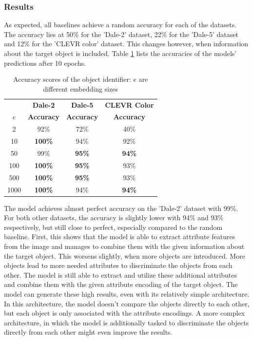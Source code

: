 \subsubsection*{Results}
As expected, all baselines achieve a random accuracy for each of the datasets.
The accuracy lies at 50\% for the 'Dale-2' dataset, 22\% for the 'Dale-5' dataset and 12\% for the 'CLEVR color' dataset.
This changes however, when information about the target object is included.
Table \ref{tab:results_bounding_box_classifier} lists the accuracies of the models' predictions after 10 epochs.

\begin{table}[ht]
    \centering
    \begin{tabular}{c|c|c|c}
        \toprule
               & \textbf{Dale-2}   & \textbf{Dale-5}   & \textbf{CLEVR Color} \\\cmidrule(lr){2-2}\cmidrule(lr){3-3}\cmidrule(lr){4-4}
        $e$    & \textbf{Accuracy} & \textbf{Accuracy} & \textbf{Accuracy}    \\\midrule
        {2}    & {92\%}            & {72\%}            & {40\%}               \\
        {10}   & \textbf{100\%}    & {94\%}            & {92\%}               \\
        {50}   & {99\%}            & \textbf{95\%}     & \textbf{94\%}        \\
        {100}  & \textbf{100\%}    & \textbf{95\%}     & {93\%}               \\
        {500}  & \textbf{100\%}    & \textbf{95\%}     & {93\%}               \\
        {1000} & \textbf{100\%}    & {94\%}            & \textbf{94\%}        \\
        \bottomrule
    \end{tabular}
    \caption{Accuracy scores of the object identifier: $e$ are different embedding sizes}
    \label{tab:results_bounding_box_classifier}
\end{table}

The model achieves almost perfect accuracy on the 'Dale-2' dataset with 99\%.
For both other datasets, the accuracy is slightly lower with 94\% and 93\% respectively, but still close to perfect, especially compared to the random baseline.
First, this shows that the model is able to extract attribute features from the image and manages to combine them with the given information about the target object.
This worsens slightly, when more objects are introduced.
More objects lead to more needed attributes to discriminate the objects from each other.
The model is still able to extract and utilize these additional attributes and combine them with the given attribute encoding of the target object.
The model can generate these high results, even with its relatively simple architecture.
In this architecture, the model doesn't compare the objects directly to each other, but each object is only associated with the attribute encodings.
A more complex architecture, in which the model is additionally tasked to discriminate the objects directly from each other might even improve the results.


